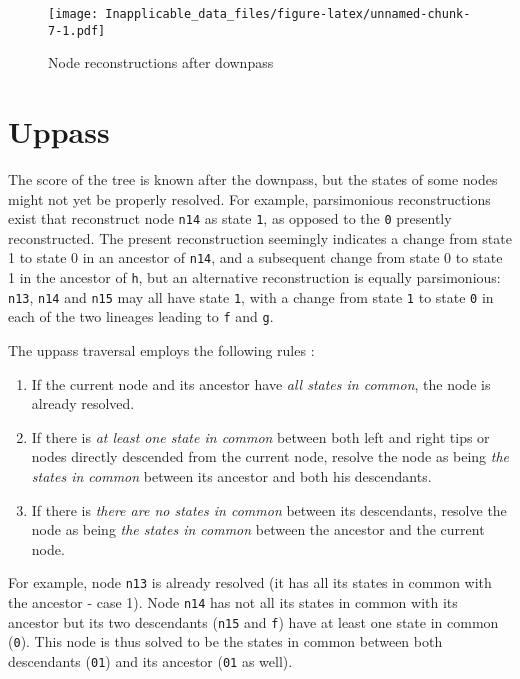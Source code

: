 \documentclass[]{book}
\providecommand{\tightlist}{%
  \setlength{\itemsep}{0pt}\setlength{\parskip}{0pt}}
\theoremstyle{definition}
\theoremstyle{definition}
\theoremstyle{definition}
\theoremstyle{remark}
\begin{document}
\begin{figure}
\centering
\texttt{[image: Inapplicable\_data\_files/figure-latex/unnamed-chunk-7-1.pdf]}
\caption{\label{fig:unnamed-chunk-7}Node reconstructions after downpass}
\end{figure}

\hypertarget{uppass}{%
\section{Uppass}\label{uppass}}

The score of the tree is known after the downpass, but the states of
some nodes might not yet be properly resolved. For example, parsimonious
reconstructions exist that reconstruct node \texttt{n14} as state
\texttt{1}, as opposed to the \texttt{0} presently reconstructed. The
present reconstruction seemingly indicates a change from state 1 to
state 0 in an ancestor of \texttt{n14}, and a subsequent change from
state 0 to state 1 in the ancestor of \texttt{h}, but an alternative
reconstruction is equally parsimonious: \texttt{n13}, \texttt{n14} and
\texttt{n15} may all have state \texttt{1}, with a change from state
\texttt{1} to state \texttt{0} in each of the two lineages leading to
\texttt{f} and \texttt{g}.

The uppass traversal employs the following rules \citep{Fitch1971}:

\begin{enumerate}
\def\labelenumi{\arabic{enumi}.}
\tightlist
\item
  If the current node and its ancestor have \emph{all states in common},
  the node is already resolved.
\item
  If there is \emph{at least one state in common} between both left and
  right tips or nodes directly descended from the current node, resolve
  the node as being \emph{the states in common} between its ancestor and
  both his descendants.
\item
  If there is \emph{there are no states in common} between its
  descendants, resolve the node as being \emph{the states in common}
  between the ancestor and the current node.
\end{enumerate}

For example, node \texttt{n13} is already resolved (it has all its
states in common with the ancestor - case 1). Node \texttt{n14} has not
all its states in common with its ancestor but its two descendants
(\texttt{n15} and \texttt{f}) have at least one state in common
(\texttt{0}). This node is thus solved to be the states in common
between both descendants (\texttt{01}) and its ancestor (\texttt{01} as
well).
\end{document}
